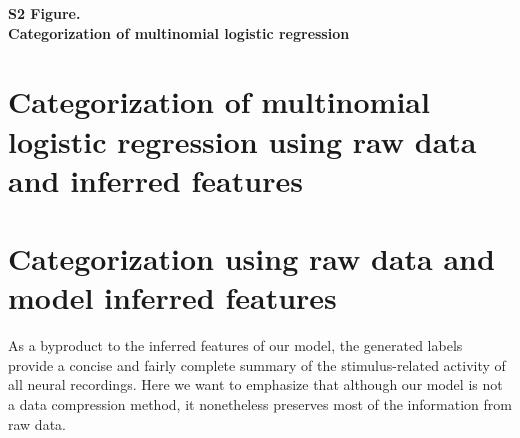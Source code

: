 \documentclass[10pt,letterpaper]{article}
\date{}
\begin{document}
\vspace*{0.35in}

\begin{flushleft}
{\Large
\textbf{S2 Figure. \\}
\bigskip
\textbf{Categorization of multinomial logistic regression} %
}
\newline
\bigskip

%
%




\end{flushleft}

\section{Categorization of multinomial logistic regression using raw data and inferred features}

\section*{Categorization using raw data and model inferred features}
As a byproduct to the inferred features of our model, the generated labels provide a concise and fairly complete summary of the stimulus-related activity of all neural recordings. Here we want to emphasize that although our model is not a data compression method, it nonetheless preserves most of the information from raw data.
\end{document}
